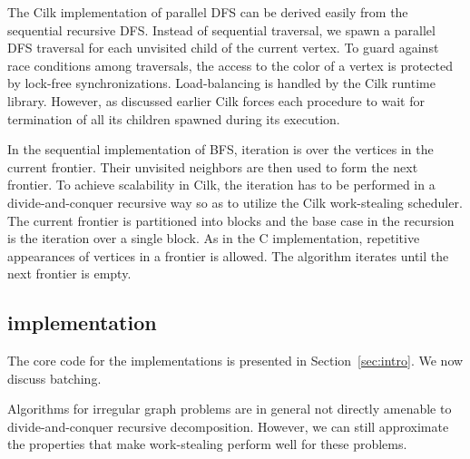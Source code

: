 The Cilk implementation of parallel DFS can be derived easily from the
sequential recursive DFS. Instead of sequential traversal, we spawn a
parallel DFS traversal for each unvisited child of the
current vertex. To guard against race conditions among traversals, the
access to the color of a vertex is protected by lock-free
synchronizations. Load-balancing is handled by the Cilk runtime
library. However, as discussed earlier Cilk forces each procedure to
wait for termination of all its children spawned during its execution.

In the sequential implementation of BFS, iteration is over the vertices in the current frontier. Their unvisited neighbors are then used to form the next frontier. To achieve scalability in Cilk, the iteration has to be performed in a divide-and-conquer recursive way so as to utilize the Cilk work-stealing scheduler. The current frontier is partitioned into blocks and the base case in the recursion is the iteration over a single block. As in
the C implementation, repetitive appearances of vertices in a frontier is
allowed. The algorithm iterates until the next frontier is empty.


\subsection{\XWS{} implementation}\label{sec:Performance}

The core code for the \XWS{} implementations is presented in 
Section~\ref{sec:intro}.  We now discuss batching.


Algorithms for irregular graph problems are in general not directly
amenable to divide-and-conquer recursive decomposition. However, we
can still approximate the properties that make work-stealing perform
well for these problems.


